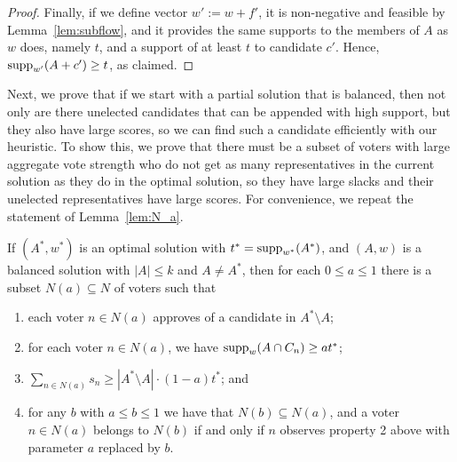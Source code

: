 \begin{proof}
Finally, if we define vector $w':=w+f'$, it is non-negative and feasible by Lemma~\ref{lem:subflow}, and it provides the same supports to the members of $A$ as $w$ does, namely $t$, and a support of at least $t$ to candidate $c'$. Hence, $\operatorname{supp}_{w'}(A+c')\geq t$, as claimed.   
\end{proof}

Next, we prove that if we start with a partial solution that is balanced, then not only are there unelected candidates that can be appended with high support, but they also have large scores, so we can find such a candidate efficiently with our heuristic. 
To show this, we prove that there must be a subset of voters with large aggregate vote strength who do not get as many representatives in the current solution as they do in the optimal solution, so they have large slacks and their unelected representatives have large scores. For convenience, we repeat the statement of Lemma~\ref{lem:N_a}.

\begin{lemma*}
If $(A^*, w^*)$ is an optimal solution with $t^*=\operatorname{supp}_{w^*}(A^*)$, and $(A,w)$ is a balanced solution with $|A|\leq k$ and $A\neq A^*$, then for each $0\leq a\leq 1$ there is a subset $N(a)\subseteq N$ of voters such that 
\begin{enumerate}
	\item each voter $n\in N(a)$ approves of a candidate in $A^*\setminus A$;
	\item for each voter $n\in N(a)$, we have $\operatorname{supp}_w(A\cap C_n)\geq at^*$;
	\item $\sum_{n\in N(a)} s_n \geq |A^* \setminus A|\cdot (1-a) t^*$; and
	\item for any $b$ with $a\leq b\leq 1$ we have that $N(b)\subseteq N(a)$, and a voter $n\in N(a)$ belongs to $N(b)$ if and only if $n$ observes property 2 above with parameter $a$ replaced by $b$.
\end{enumerate}
\end{lemma*}


